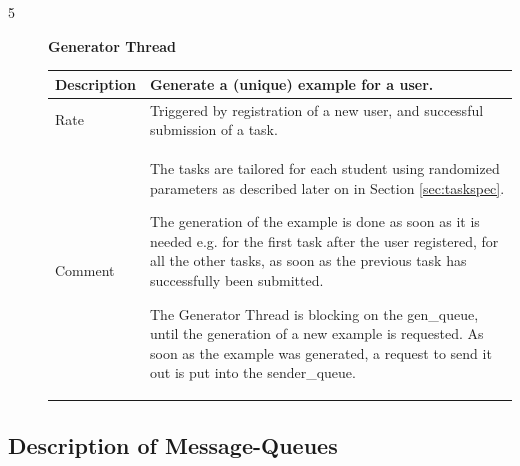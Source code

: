 \begin{description}
    \item [5] \textbf{Generator Thread} \\
    \begin{tabular}{|p{2cm}|p{11cm}|}
        \hline
        Description & Generate a (unique) example for a user. \\
        \hline
        Rate & Triggered by registration of a new user, and successful submission of a task.  \\
        \hline
        Comment & The tasks are tailored for each student using randomized parameters as described
            later on in Section \ref{sec:taskspec}. 

            The generation of the example is done as soon as it is needed e.g. for the first
            task after the user registered, for all the other tasks, as soon as the previous
            task has successfully been submitted.

            The Generator Thread is blocking on the gen\_queue, until the generation of a new
            example is requested. As soon as the example was generated, a request to send it
            out is put into the sender\_queue.
        \\
        \hline
    \end{tabular}
\end{description}

\subsection{Description of Message-Queues}

